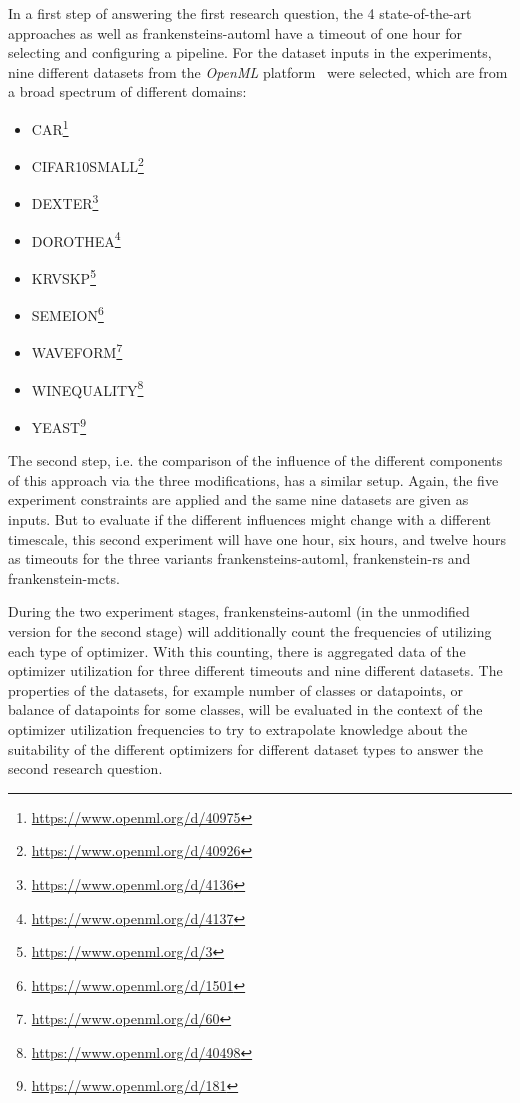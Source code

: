In a first step of answering the first research question, the 4 state-of-the-art approaches as well as frankensteins-automl have a timeout of one hour for selecting and configuring a pipeline.
For the dataset inputs in the experiments, nine different datasets from the \textit{OpenML} platform~\cite{Vanschoren-OpenML} were selected, which are from a broad spectrum of different domains:
\begin{itemize}
    \item CAR\footnote{\url{https://www.openml.org/d/40975}}
    \item CIFAR10SMALL\footnote{\url{https://www.openml.org/d/40926}}
    \item DEXTER\footnote{\url{https://www.openml.org/d/4136}}
    \item DOROTHEA\footnote{\url{https://www.openml.org/d/4137}}
    \item KRVSKP\footnote{\url{https://www.openml.org/d/3}}
    \item SEMEION\footnote{\url{https://www.openml.org/d/1501}}
    \item WAVEFORM\footnote{\url{https://www.openml.org/d/60}}
    \item WINEQUALITY\footnote{\url{https://www.openml.org/d/40498}}
    \item YEAST\footnote{\url{https://www.openml.org/d/181}}
\end{itemize}

The second step, i.e. the comparison of the influence of the different components of this approach via the three modifications, has a similar setup.
Again, the five experiment constraints are applied and the same nine datasets are given as inputs.
But to evaluate if the different influences might change with a different timescale, this second experiment will have one hour, six hours, and twelve hours as timeouts for the three variants frankensteins-automl, frankenstein-rs and frankenstein-mcts.

During the two experiment stages, frankensteins-automl (in the unmodified version for the second stage) will additionally count the frequencies of utilizing each type of optimizer.
With this counting, there is aggregated data of the optimizer utilization for three different timeouts and nine different datasets.
The properties of the datasets, for example number of classes or datapoints, or balance of datapoints for some classes, will be evaluated in the context of the optimizer utilization frequencies to try to extrapolate knowledge about the suitability of the different optimizers for different dataset types to answer the second research question.

